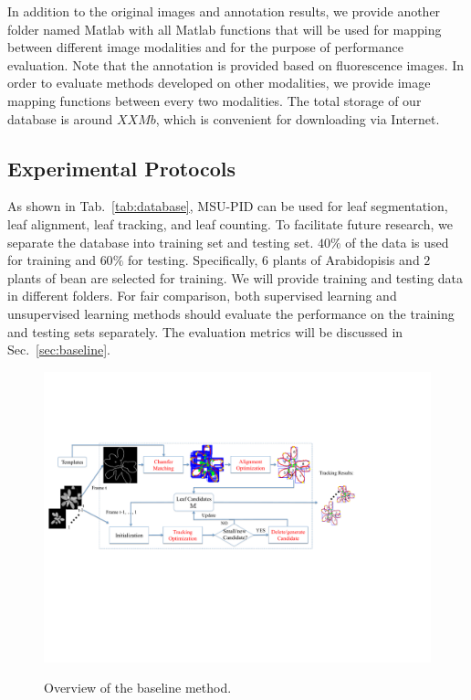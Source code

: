 In addition to the original images and annotation results, we provide another folder named Matlab with all Matlab functions that will be used for mapping between different image modalities and for the purpose of performance evaluation.
Note that the annotation is provided based on fluorescence images.
In order to evaluate methods developed on other modalities, we provide image mapping functions between every two modalities.
The total storage of our database is around $XX Mb$, which is convenient for downloading via Internet.

\subsection{Experimental Protocols}

As shown in Tab.~\ref{tab:database}, MSU-PID can be used for leaf segmentation, leaf alignment, leaf tracking, and leaf counting.
To facilitate future research, we separate the database into training set and testing set.
$40\%$ of the data is used for training and $60\%$ for testing.
Specifically, $6$ plants of Arabidopisis and $2$ plants of bean are selected for training.
We will provide training and testing data in different folders.
For fair comparison, both supervised learning and unsupervised learning methods should evaluate the performance on the training and testing sets separately.
The evaluation metrics will be discussed in Sec.~\ref{sec:baseline}.

\begin{figure}[t!]
\centering
\includegraphics[width=.98\textwidth]{Figures/overview}\\
\caption{Overview of the baseline method.}
\label{fig:methodOverview}
\end{figure}

